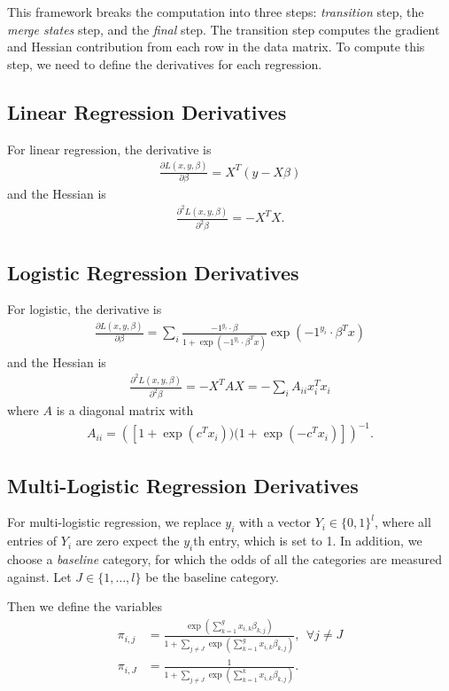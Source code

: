 \documentclass[12pt]{article}
\begin{document}
This framework breaks the computation into three steps: \textit{transition} step, the \textit{merge states} step, and the \textit{final} step.  The transition step computes the gradient and Hessian contribution from each row in the data matrix.  To compute this step, we need to define the derivatives for each regression.  
\subsection{Linear Regression Derivatives}
For linear regression, the derivative is 
\begin{align}
\frac{\partial L(x,y,\beta)}{\partial \beta} = X^T(y - X \beta)
\end{align}
and the Hessian is
\begin{align}
\frac{\partial^2 L(x,y,\beta)}{\partial^2 \beta} = -X^TX. 
\end{align}

\subsection{Logistic Regression Derivatives}
For logistic, the derivative is 
\begin{align}
\frac{\partial L(x,y,\beta)}{\partial \beta} = \sum_i \frac{-1^{y_i}\cdot \beta}{1 + \exp(-1^{y_i} \cdot  \beta^Tx)}  \exp(-1^{y_i}\cdot \beta^Tx)
\end{align}
and the Hessian is
\begin{align}
\frac{\partial^2 L(x,y,\beta)}{\partial^2 \beta} = -X^TAX = -\sum_i A_{ii} x_i^T x_i 
\end{align}
where $A$ is a diagonal matrix with 
\begin{align}
A_{ii} = \left( [1 + \exp(c^Tx_i) ) (1 + \exp(-c^Tx_i)] \right)^{-1}.
\end{align}

\subsection{Multi-Logistic Regression Derivatives}
For multi-logistic regression,  we replace $y_i$ with a vector $Y_i \in \{0,1\}^l$, where all entries of $Y_i$ are zero expect the $y_i$th entry, which is set to 1.  In addition, we choose a \textit{baseline} category, for which the odds of all the categories are measured against.  Let $J \in \{1, \dots, l \}$ be the baseline category.  

Then we define the variables
\begin{align}
\pi_{i,j} &= \frac{\exp\left(\sum_{k=1}^g x_{i,k} \beta_{k,j} \right)}{1 + \sum_{j\ne J} \exp \left(\sum_{k=1}^g x_{i,k} \beta_{k,j} \right)}, \ \ \forall j \ne J\\
\pi_{i,J} &= \frac{1}{1 + \sum_{j\ne J} \exp \left(\sum_{k=1}^k x_{i,k} \beta_{k,j} \right)}.
\end{align}
\end{document}
